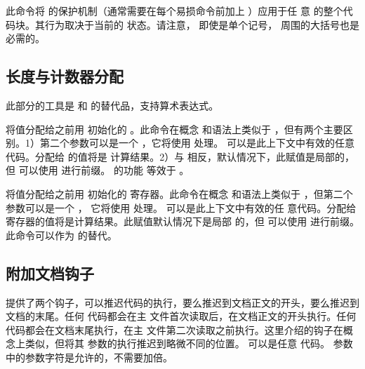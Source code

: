 \documentclass{ltxdockit}[2010/09/26]
\begin{document}
\begin{ltxsyntax}


  此命令将 \latex 的保护机制（通常需要在每个易损命令前加上 ）应用于任
  意  的整个代码块。其行为取决于当前的  状态。请注意，
  即使是单个记号， 周围的大括号也是必需的。

\end{ltxsyntax}

\subsection[长度与计数器]{长度与计数器分配}
\label{use:cal}

此部分的工具是  和  的替代品，支持算术表达式。

\begin{ltxsyntax}


  将值分配给之前用  初始化的 \latex {}。此命令在概念
  和语法上类似于 ，但有两个主要区别。1）第二个参数可以是一个
  ，它将使用  处理。  可以是此上下文中有效的任意代码。分配给  的值将是
  计算结果。2）与  相反，默认情况下，此赋值是局部的，但
   可以使用  进行前缀。  的功能
  等效于 。


  将值分配给之前用  初始化的  寄存器。此命令在概念
  和语法上类似于 ，但第二个参数可以是一个 ，
  它将使用  处理。  可以是此上下文中有效的任
  意代码。分配给  寄存器的值将是计算结果。此赋值默认情况下是局部
  的，但  可以使用  进行前缀。此命令可以作为
   的替代。

\end{ltxsyntax}

\subsection[文档钩子]{附加文档钩子}
\label{use:pre}

\latex 提供了两个钩子，可以推迟代码的执行，要么推迟到文档正文的开头，要么推迟到文档的末尾。任何 
代码都会在主  文件首次读取后，在文档正文的开头执行。任何  代码都会在文档末尾执行，在主
 文件第二次读取之前执行。这里介绍的钩子在概念上类似，但将其  参数的执行推迟到略微不同的位置。
 可以是任意 \tex 代码。  参数中的参数字符是允许的，不需要加倍。
\end{document}
